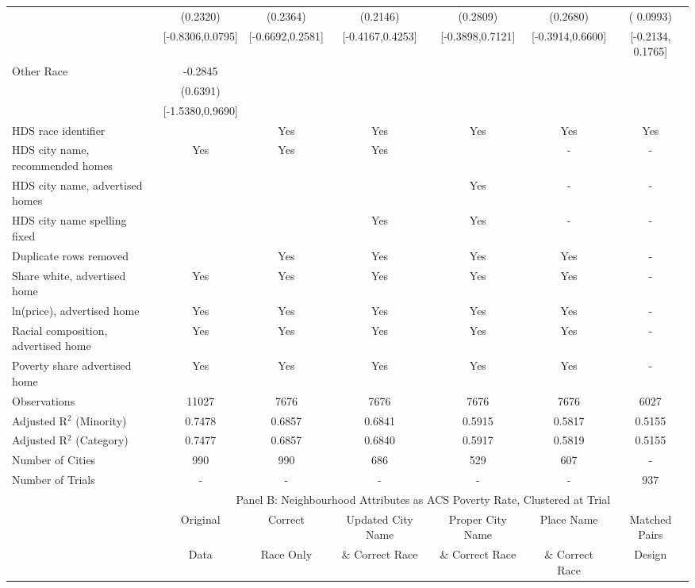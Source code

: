 \begin{table}[htbp]
{\begin{tabular}{l*{6}{c}}
 & (0.2320) & (0.2364) & (0.2146) & (0.2809) & (0.2680) & ( 0.0993) \\
 & [-0.8306,0.0795] & [-0.6692,0.2581] & [-0.4167,0.4253] & [-0.3898,0.7121] & [-0.3914,0.6600] & [-0.2134,  0.1765] \\
Other Race & -0.2845 &  &  &  &  &  \\
 & (0.6391) &  &  &  &  &  \\
 & [-1.5380,0.9690] &  &  &  &  &  \\
\midrule
HDS race identifier & & Yes & Yes & Yes & Yes & Yes \\
HDS city name, recommended homes & Yes & Yes & Yes & & - & -\\
HDS city name, advertised homes &  &  &  & Yes & - & -\\
HDS city name spelling fixed & & & Yes & Yes & - & -\\
Duplicate rows removed &  & Yes & Yes & Yes & Yes & - \\
\midrule
Share white, advertised home  & Yes & Yes & Yes & Yes & Yes & - \\
ln(price), advertised home  & Yes & Yes & Yes & Yes & Yes & - \\
Racial composition, advertised home & Yes & Yes & Yes & Yes & Yes & - \\
Poverty share advertised home & Yes & Yes & Yes & Yes & Yes & - \\
Observations & 11027 & 7676 & 7676 & 7676 & 7676 & 6027 \\
Adjusted R$^2$ (Minority) & 0.7478 & 0.6857 & 0.6841 & 0.5915 & 0.5817 & 0.5155 \\
Adjusted R$^2$ (Category) & 0.7477 & 0.6857 & 0.6840 & 0.5917 & 0.5819 & 0.5155 \\
Number of Cities & 990 & 990 & 686 & 529 & 607 & - \\
Number of Trials & - & - & - & - & - & 937 \\
\bottomrule
\toprule
& \multicolumn{6}{c}{Panel B: Neighbourhood Attributes as ACS Poverty Rate, Clustered at Trial}\\
\toprule
                    &\multicolumn{1}{c}{Original}&\multicolumn{1}{c}{Correct}&\multicolumn{1}{c}{Updated City Name}&\multicolumn{1}{c}{Proper City Name}&\multicolumn{1}{c}{Place Name}&\multicolumn{1}{c}{Matched Pairs}\\
                      &\multicolumn{1}{c}{Data}&\multicolumn{1}{c}{Race Only}&\multicolumn{1}{c}{\& Correct Race}&\multicolumn{1}{c}{\& Correct Race}&\multicolumn{1}{c}{\& Correct Race}&\multicolumn{1}{c}{Design}\\                  

\end{tabular}}
\end{table}
